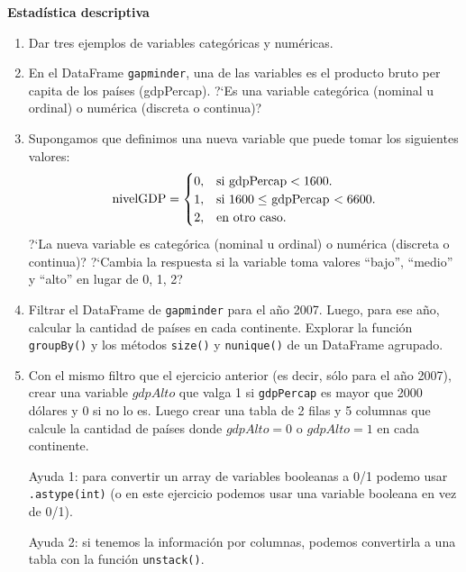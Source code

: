 \documentclass[a4paper,11pt]{article}
\theoremstyle{definition}
\begin{document}
\textbf{\large Estad\'istica descriptiva}
\begin{enumerate}[resume]

\item Dar tres ejemplos de variables categ\'oricas y num\'ericas.

\item En el DataFrame \lstinline{gapminder}, una de las variables es el producto bruto per capita de los pa\'ises (gdpPercap). ?`Es una variable categ\'orica (nominal u ordinal) o num\'erica (discreta o continua)?

\item Supongamos que definimos una nueva variable que puede tomar los siguientes valores:
\[
\text{nivelGDP} = \begin{cases}
0, & \text{si \lstinline{gdpPercap}} < 1600. \\
1, & \text{si $1600 \le $ \lstinline{gdpPercap} $< 6600$}. \\
2, & \text{en otro caso.} \\
\end{cases}
\]
?`La nueva variable
 es categ\'orica (nominal u ordinal) o num\'erica (discreta o continua)? ?`Cambia la respuesta si la variable
 toma valores ``bajo'', ``medio'' y ``alto'' en lugar de 0, 1, 2?

\item Filtrar el DataFrame de \lstinline{gapminder} para el a\~no 2007. Luego, para ese a\~no, calcular la cantidad de pa\'ises en cada continente. Explorar la función \lstinline{groupBy()} y los métodos \lstinline{size()} y \lstinline{nunique()} de un DataFrame agrupado.

\item Con el mismo filtro que el ejercicio anterior (es decir, s\'olo para el a\~no 2007), crear una variable $gdpAlto$
 que valga 1 si \lstinline{gdpPercap} es mayor que 2000 d\'olares y 0 si no lo es. Luego crear una tabla de 2 filas y 5 columnas que calcule la cantidad de pa\'ises donde $gdpAlto = 0$ o $gdpAlto = 1$  en cada continente. 
 
 Ayuda 1: para convertir un array de variables booleanas a 0/1 podemo usar \lstinline{.astype(int)} (o en este ejercicio podemos usar una variable booleana en vez de 0/1).
 
 Ayuda 2: si tenemos la informaci\'on por columnas, podemos convertirla a una tabla con la funci\'on \lstinline{unstack()}.



\end{enumerate}
\end{document}
